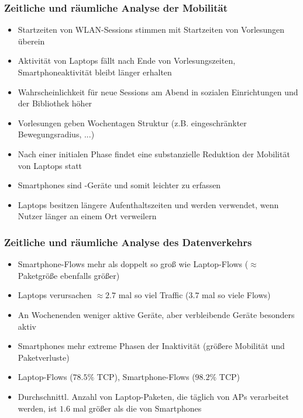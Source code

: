 \documentclass{beamer}
\begin{document}
\begin{frame}
  \frametitle{Zeitliche und räumliche Analyse der Mobilität}
  \begin{itemize}
    \item Startzeiten von WLAN-Sessions stimmen mit Startzeiten von Vorlesungen überein
    \item Aktivität von Laptops fällt nach Ende von Vorlesungszeiten, Smartphoneaktivität bleibt länger erhalten
    \item Wahrscheinlichkeit für neue Sessions am Abend in sozialen Einrichtungen und der Bibliothek höher
    \item Vorlesungen geben Wochentagen Struktur (z.B. eingeschränkter Bewegungsradius, ...)
    \item Nach einer initialen Phase findet eine substanzielle Reduktion der Mobilität von Laptops statt
    \item Smartphones sind -Geräte und somit leichter zu erfassen
    \item Laptops besitzen längere Aufenthaltszeiten und werden verwendet, wenn Nutzer länger an einem Ort verweilern
  \end{itemize}
\end{frame}

\begin{frame}
  \frametitle{Zeitliche und räumliche Analyse des Datenverkehrs}
  \begin{itemize}
    \item Smartphone-Flows mehr als doppelt so groß wie Laptop-Flows ($\approx$ Paketgröße ebenfalls größer)
    \item Laptops verursachen $\approx 2.7$ mal so viel Traffic ($3.7$ mal so viele Flows)
    \item An Wochenenden weniger aktive Geräte, aber verbleibende Geräte besonders aktiv
    \item Smartphones mehr extreme Phasen der Inaktivität (größere Mobilität und Paketverluste)
    \item Laptop-Flows ($78.5 \%$ TCP), Smartphone-Flows ($98.2 \%$ TCP)
    \item Durchschnittl. Anzahl von Laptop-Paketen, die täglich von APs verarbeitet werden, ist $1.6$ mal größer als die von Smartphones    
  \end{itemize}
  
\end{frame}
\end{document}
